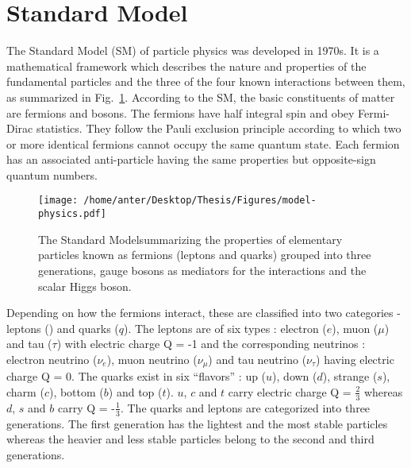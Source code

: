 \section{Standard Model}
The Standard Model (SM) of particle physics \cite{Perkins:1982xb,Herrero:1998eq,Weinberg:1967tq} was developed in 1970s. It is a mathematical framework which describes the nature and properties of the fundamental particles and the three of the four known interactions between them, as summarized in Fig.~\ref{fig:SM}. According to the SM, the basic constituents of matter are fermions and bosons. The fermions have half integral spin and obey Fermi-Dirac statistics. They follow the Pauli exclusion principle according to which two or more identical fermions cannot occupy the same quantum state. Each fermion has an associated anti-particle having the same properties but opposite-sign quantum numbers.
\begin{figure}[!h]
\begin{center}
\hspace*{-5mm}
\texttt{[image: /home/anter/Desktop/Thesis/Figures/model-physics.pdf]}\\
\caption[The Standard Model summarizing the properties of elementary particles and their forces of interaction.]{The Standard Model\footnotemark summarizing the properties of elementary particles known as fermions (leptons and quarks) grouped into three generations, gauge bosons as mediators for the interactions and the scalar Higgs boson.}%
\label{fig:SM}
\end{center}
\end{figure}

Depending on how the fermions interact, these are classified into two categories - leptons (\sln) and quarks ($q$). The leptons are of six types : electron ($e$), muon ($\mu$) and tau ($\tau$) with electric charge Q = -1 and the corresponding neutrinos : electron neutrino ($\nu_e$), muon neutrino ($\nu_\mu$) and tau neutrino ($\nu_\tau$) having electric charge Q = 0. The quarks exist in six ``flavors'' : up ($u$), down ($d$), strange ($s$), charm ($c$), bottom ($b$) and top ($t$). $u$, $c$ and $t$ carry electric charge Q = \plusn$\frac{2}{3}$ whereas $d$, $s$ and $b$ carry Q = -$\frac{1}{3}$. The quarks and leptons are categorized into three generations. The first generation has the lightest and the most stable particles whereas the heavier and less stable particles belong to the second and third generations.


